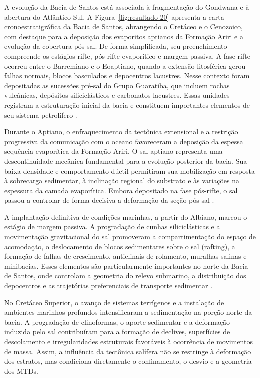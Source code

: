 A evolução da Bacia de Santos está associada à fragmentação do Gondwana e à abertura do Atlântico Sul. A Figura~\ref{fig:resultado-20} apresenta a carta cronoestratigráfica da Bacia de Santos, abrangendo o Cretáceo e o Cenozoico, com destaque para a deposição dos evaporitos aptianos da Formação Ariri e a evolução da cobertura pós-sal. De forma simplificada, seu preenchimento compreende os estágios rifte, pós-rifte evaporítico e margem passiva. A fase rifte ocorreu entre o Barremiano e o Eoaptiano, quando a extensão litosférica gerou falhas normais, blocos basculados e depocentros lacustres. Nesse contexto foram depositadas as sucessões pré-sal do Grupo Guaratiba, que incluem rochas vulcânicas, depósitos siliciclásticos e carbonatos lacustres. Essas unidades registram a estruturação inicial da bacia e constituem importantes elementos de seu sistema petrolífero \cite{macedo1989,moreira2007}.

Durante o Aptiano, o enfraquecimento da tectônica extensional e a restrição progressiva da comunicação com o oceano favoreceram a deposição da espessa sequência evaporítica da Formação Ariri. O sal aptiano representa uma descontinuidade mecânica fundamental para a evolução posterior da bacia. Sua baixa densidade e comportamento dúctil permitiram sua mobilização em resposta à sobrecarga sedimentar, à inclinação regional do substrato e às variações na espessura da camada evaporítica. Embora depositado na fase pós-rifte, o sal passou a controlar de forma decisiva a deformação da seção pós-sal \cite{assine2008,moreira2007}.

A implantação definitiva de condições marinhas, a partir do Albiano, marcou o estágio de margem passiva. A progradação de cunhas siliciclásticas e a movimentação gravitacional do sal promoveram a compartimentação do espaço de acomodação, o deslocamento de blocos sedimentares sobre o sal (rafting), a formação de falhas de crescimento, anticlinais de rolamento, muralhas salinas e minibacias. Esses elementos são particularmente importantes no norte da Bacia de Santos, onde controlam a geometria do relevo submarino, a distribuição dos depocentros e as trajetórias preferenciais de transporte sedimentar \cite{assine2008}.

No Cretáceo Superior, o avanço de sistemas terrígenos e a instalação de ambientes marinhos profundos intensificaram a sedimentação na porção norte da bacia. A progradação de clinoformas, o aporte sedimentar e a deformação induzida pelo sal contribuíram para a formação de declives, superfícies de descolamento e irregularidades estruturais favoráveis à ocorrência de movimentos de massa. Assim, a influência da tectônica salífera não se restringe à deformação dos estratos, mas condiciona diretamente o confinamento, o desvio e a geometria dos MTDs.

